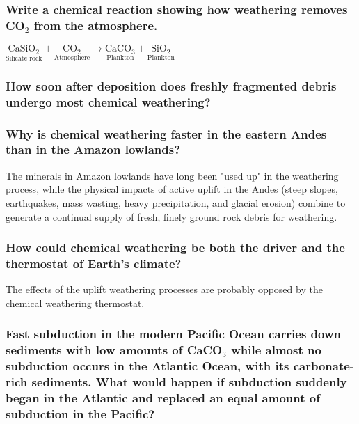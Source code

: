 \subsubsection{Write a chemical reaction showing how weathering removes
CO$_2$ from the atmosphere.}
$\underset{\text{Silicate rock}}{\text{CaSiO}_2} +
\underset{\text{Atmosphere}}{\text{CO}_2}
\rightarrow
\underset{\text{Plankton}}{\text{CaCO}_3}
+
\underset{\text{Plankton}}{\text{SiO}_2}$

\subsubsection{How soon after deposition does freshly fragmented debris undergo
most chemical weathering?}

\subsubsection{Why is chemical weathering faster in the eastern Andes than in
the Amazon lowlands?}
The minerals in Amazon lowlands have long been "used up" in the weathering
process, while the physical impacts of active uplift in the Andes (steep
slopes, earthquakes, mass wasting, heavy precipitation, and glacial erosion)
combine to generate a continual supply of fresh, finely ground rock debris for
weathering.

\subsubsection{How could chemical weathering be both the driver and the
thermostat of Earth's climate?}
The effects of the uplift weathering processes are probably opposed by the
chemical weathering thermostat.

\subsubsection{Fast subduction in the modern Pacific Ocean carries down
sediments with low amounts of CaCO$_3$ while almost no subduction occurs in
the Atlantic Ocean, with its carbonate-rich sediments. What would happen if
subduction suddenly began in the Atlantic and replaced an equal amount of
subduction in the Pacific?}
